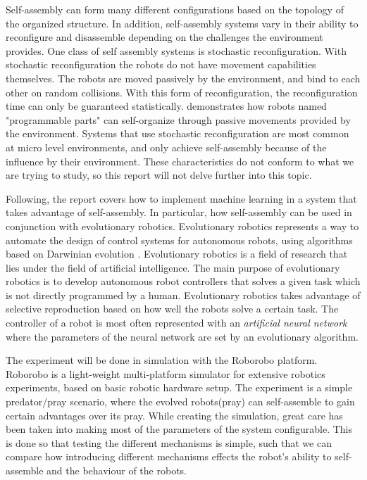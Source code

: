 Self-assembly can form many different configurations based on the topology of the organized structure.
In addition, self-assembly systems vary in their ability to reconfigure and disassemble depending on the challenges the environment provides.
One class of self assembly systems is stochastic reconfiguration. 
With stochastic reconfiguration the robots do not have movement capabilities themselves. 
The robots are moved passively by the environment, and bind to each other on random collisions\cite{gro_autonomous_2006}. 
With this form of reconfiguration, the reconfiguration time can only be guaranteed statistically\cite{yim_modular_2007}.
\cite{bishop_programmable_2005} demonstrates how robots named "programmable parts" can self-organize through passive movements provided by the environment. Systems that use stochastic reconfiguration are most common at micro level environments, and only achieve self-assembly because of the influence by their environment.
These characteristics do not conform to what we are trying to study, so this report will not delve further into this topic.

Following, the report covers how to implement machine learning in a system that takes advantage of self-assembly.
In particular, how self-assembly can be used in conjunction with evolutionary robotics.
Evolutionary robotics represents a way to automate the design of control systems for autonomous robots, using algorithms based on Darwinian evolution \cite{trianni_evolving_2004}.
Evolutionary robotics is a field of research that lies under the field of artificial intelligence. 
The main purpose of evolutionary robotics is to develop autonomous robot controllers that solves a given task which is not directly programmed by a human.
Evolutionary robotics takes advantage of selective reproduction based on how well the robots solve a certain task.
The controller of a robot is most often represented with an \emph{artificial neural network} where the parameters of the neural network are set by an evolutionary algorithm.

The experiment will be done in simulation with the Roborobo platform. 
Roborobo is a light-weight multi-platform simulator for extensive robotics experiments, based on basic robotic hardware setup.
The experiment is a simple predator/pray scenario, where the evolved robots(pray) can self-assemble to gain certain advantages over its pray.
While creating the simulation, great care has been taken into making most of the parameters of the system configurable.
This is done so that testing the different mechanisms is simple, such that we can compare how introducing different mechanisms effects the robot's ability to self-assemble and the behaviour of the robots.

